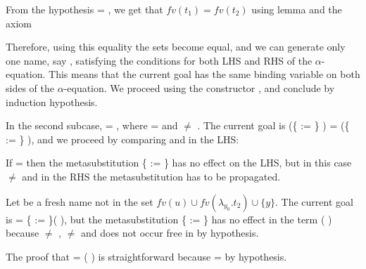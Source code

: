 From the hypothesis  = , we get that $fv(t_1) = fv(t_2)$ using lemma  and the axiom \begin{coqdoccode}
 \end{coqdoccode}
Therefore, using this equality the sets become equal, and we can generate only one name, say , satisfying the conditions for both LHS and RHS of the $\alpha$-equation. This means that the current goal has the same binding variable on both sides of the $\alpha$-equation. We proceed using the constructor , and conclude by induction hypothesis.\begin{coqdoccode}
 \end{coqdoccode}
 In the second subcase,  =   , where  =     and  \ensuremath{\not=} . The current goal is (\{ := \}   ) = (\{ := \}   ), and we proceed by comparing  and  in the LHS:
\begin{coqdoccode}
\end{coqdoccode}
If  =  then the metasubstitution \{ := \} has no effect on the LHS, but in this case  \ensuremath{\not=}  and in the RHS the metasubstitution has to be propagated.\begin{coqdoccode}
 \end{coqdoccode}
Let  be a fresh name not in the set $fv(u)\cup fv(\lambda_{y_0}.t_2)\cup \{y\}$. The current goal is    =   \{ := \}(   ), but the metasubstitution \{ := \} has no effect in the term (   ) because  \ensuremath{\not=} ,  \ensuremath{\not=}  and  does not occur free in  by hypothesis.\begin{coqdoccode}
 \end{coqdoccode}
The proof that    =   (   ) is straightforward because    =    by hypothesis.
